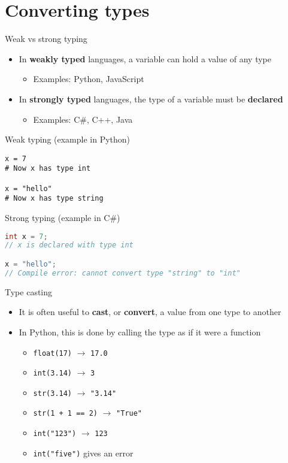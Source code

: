 \part{Converting types}
\frame{\partpage}

\begin{frame}{Weak vs strong typing}
	\begin{itemize}
		\pause\item In \textbf{weakly typed} languages, a variable can hold a value of any type
        	\begin{itemize}
        	    \pause\item Examples: Python, JavaScript
        	\end{itemize}
		\pause\item In \textbf{strongly typed} languages, the type of a variable must be \textbf{declared}
        	\begin{itemize}
        	    \pause\item Examples: C\#, C++, Java
        	\end{itemize}
	\end{itemize}
\end{frame}

\begin{frame}[fragile]{Weak typing (example in Python)}
    \begin{lstlisting}
x = 7
# Now x has type int

x = "hello"
# Now x has type string
    \end{lstlisting}
\end{frame}

\begin{frame}[fragile]{Strong typing (example in C\#)}
    \begin{lstlisting}[language=C]
int x = 7;
// x is declared with type int

x = "hello";
// Compile error: cannot convert type "string" to "int"
    \end{lstlisting}
\end{frame}

\begin{frame}{Type casting}
	\begin{itemize}
		\pause\item It is often useful to \textbf{cast}, or \textbf{convert}, a value from one type to another
		\pause\item In Python, this is done by calling the type as if it were a function
			\begin{itemize}
				\pause\item \lstinline{float(17)} $\to$ \lstinline{17.0}
				\pause\item \lstinline{int(3.14)} $\to$ \lstinline{3}
				\pause\item \lstinline{str(3.14)} $\to$ \lstinline{"3.14"}
				\pause\item \lstinline{str(1 + 1 == 2)} $\to$ \lstinline{"True"}
				\pause\item \lstinline{int("123")} $\to$ \lstinline{123}
				\pause\item \lstinline{int("five")} gives an error
			\end{itemize}
	\end{itemize}
\end{frame}

